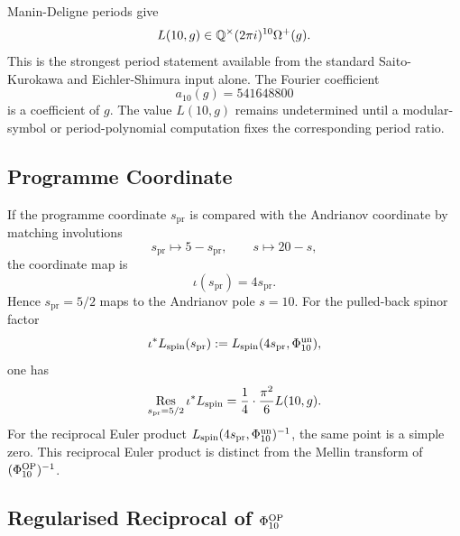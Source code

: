 Manin-Deligne periods give
\[
        L(10,g)\in
        \mathbb{Q}^{\times}(2\pi i)^{10}\Omega^+(g).
\]
This is the strongest period statement available from the standard
Saito-Kurokawa and Eichler-Shimura input alone.  The Fourier coefficient
\[
        a_{10}(g)=541648800
\]
is a coefficient of \(g\).  The value \(L(10,g)\) remains undetermined
until a modular-symbol or period-polynomial computation fixes the
corresponding period ratio.

\subsection*{Programme Coordinate}

If the programme coordinate \(s_{\mathrm{pr}}\) is compared with the
Andrianov coordinate by matching involutions
\[
        s_{\mathrm{pr}}\longmapsto 5-s_{\mathrm{pr}},\qquad
        s\longmapsto 20-s,
\]
the coordinate map is
\[
        \iota(s_{\mathrm{pr}})=4s_{\mathrm{pr}}.
\]
Hence \(s_{\mathrm{pr}}=5/2\) maps to the Andrianov pole \(s=10\).
For the pulled-back spinor factor
\[
        \iota^*L_{\mathrm{spin}}(s_{\mathrm{pr}})
        :=L_{\mathrm{spin}}(4s_{\mathrm{pr}},\Phi_{10}^{\mathrm{un}}),
\]
one has
\[
        \operatorname*{Res}_{s_{\mathrm{pr}}=5/2}
        \iota^*L_{\mathrm{spin}}
        =\frac14\cdot\frac{\pi^2}{6}L(10,g).
\]
For the reciprocal Euler product \(L_{\mathrm{spin}}(4s_{\mathrm{pr}},
\Phi_{10}^{\mathrm{un}})^{-1}\), the same point is a simple zero.  This
reciprocal Euler product is distinct from the Mellin transform of
\((\Phi_{10}^{\mathrm{OP}})^{-1}\).

\subsection*{Regularised Reciprocal of \(\Phi_{10}^{\mathrm{OP}}\)}

